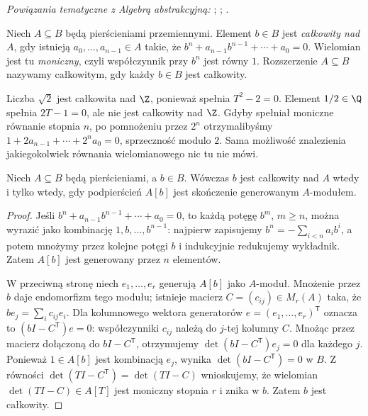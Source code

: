 \noindent\emph{Powiązania tematyczne z Algebrą abstrakcyjną:} ; ; .

\begin{definicja}
Niech $A\subseteq B$ będą pierścieniami przemiennymi.
Element $b\in B$ jest \emph{całkowity nad $A$},
gdy istnieją $a_0,\ldots,a_{n-1}\in A$ takie, że
$b^n+a_{n-1}b^{n-1}+\cdots+a_0=0$.
Wielomian jest tu \emph{moniczny}, czyli współczynnik
przy $b^n$ jest równy $1$. Rozszerzenie $A\subseteq B$
nazywamy całkowitym, gdy każdy $b\in B$ jest całkowity.
\end{definicja}

\begin{przyklad}
Liczba $\sqrt2$ jest całkowita nad $\Z$, ponieważ
spełnia $T^2-2=0$. Element $1/2\in\Q$ spełnia
$2T-1=0$, ale nie jest całkowity nad $\Z$.
Gdyby spełniał moniczne równanie stopnia $n$,
po pomnożeniu przez $2^n$ otrzymalibyśmy
$1+2a_{n-1}+\cdots+2^na_0=0$, sprzeczność
modulo $2$. Sama możliwość znalezienia jakiegokolwiek
równania wielomianowego nic tu nie mówi.
\end{przyklad}

\begin{twierdzenie}
\label{tw:integrality-module}
Niech $A\subseteq B$ będą pierścieniami, a $b\in B$.
Wówczas $b$ jest całkowity nad $A$ wtedy i tylko wtedy,
gdy podpierścień $A[b]$ jest skończenie generowanym
$A$-modułem.
\end{twierdzenie}
\begin{proof}
Jeśli $b^n+a_{n-1}b^{n-1}+\cdots+a_0=0$,
to każdą potęgę $b^m$, $m\ge n$, można wyrazić
jako kombinację $1,b,\ldots,b^{n-1}$: najpierw
zapisujemy $b^n=-\sum_{i<n}a_ib^i$,
a potem mnożymy przez kolejne potęgi $b$ i
indukcyjnie redukujemy wykładnik. Zatem
$A[b]$ jest generowany przez $n$ elementów.

W przeciwną stronę niech $e_1,\ldots,e_r$ generują
$A[b]$ jako $A$-moduł. Mnożenie przez $b$
daje endomorfizm tego modułu; istnieje macierz
$C=(c_{ij})\in M_r(A)$ taka, że
$b e_j=\sum_i c_{ij}e_i$. Dla kolumnowego
wektora generatorów $e=(e_1,\ldots,e_r)^{\mathsf T}$
oznacza to $(bI-C^{\mathsf T})e=0$:
współczynniki $c_{ij}$ należą do $j$-tej kolumny $C$.
Mnożąc przez macierz dołączoną do $bI-C^{\mathsf T}$,
otrzymujemy $\det(bI-C^{\mathsf T})e_j=0$
dla każdego $j$. Ponieważ $1\in A[b]$ jest
kombinacją $e_j$, wynika
$\det(bI-C^{\mathsf T})=0$ w $B$.
Z równości $\det(TI-C^{\mathsf T})=\det(TI-C)$
wnioskujemy, że wielomian
$\det(TI-C)\in A[T]$ jest moniczny stopnia $r$
i znika w $b$. Zatem $b$ jest całkowity.
\end{proof}

